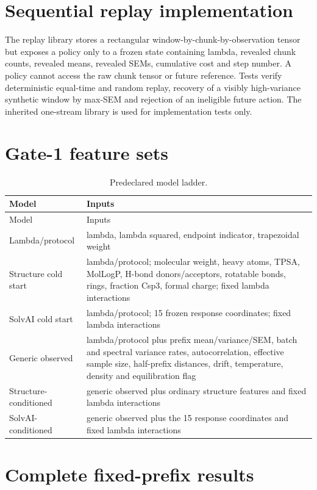 \documentclass[11pt]{article}
\begin{document}
\section{Sequential replay implementation}

The replay library stores a rectangular window-by-chunk-by-observation tensor but
exposes a policy only to a frozen state containing lambda, revealed chunk counts,
revealed means, revealed SEMs, cumulative cost and step number. A policy cannot access
the raw chunk tensor or future reference. Tests verify deterministic equal-time and
random replay, recovery of a visibly high-variance synthetic window by max-SEM and
rejection of an ineligible future action. The inherited one-stream library is used for
implementation tests only.

\section{Gate-1 feature sets}

\begin{longtable}{p{}p{}}
\caption{Predeclared model ladder.}\\
\toprule
Model & Inputs \\
\midrule
\endfirsthead
\toprule
Model & Inputs \\
\midrule
\endhead
Lambda/protocol & lambda, lambda squared, endpoint indicator, trapezoidal weight \\
Structure cold start & lambda/protocol; molecular weight, heavy atoms, TPSA, MolLogP,
H-bond donors/acceptors, rotatable bonds, rings, fraction Csp3, formal charge; fixed
lambda interactions \\
SolvAI cold start & lambda/protocol; 15 frozen response coordinates; fixed lambda
interactions \\
Generic observed & lambda/protocol plus prefix mean/variance/SEM, batch and spectral
variance rates, autocorrelation, effective sample size, half-prefix distances, drift,
temperature, density and equilibration flag \\
Structure-conditioned & generic observed plus ordinary structure features and fixed
lambda interactions \\
SolvAI-conditioned & generic observed plus the 15 response coordinates and fixed
lambda interactions \\
\bottomrule
\end{longtable}

\section{Complete fixed-prefix results}
\end{document}
